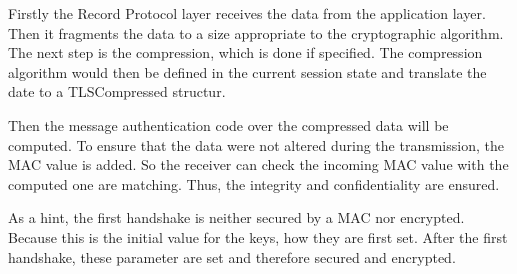 Firstly the Record Protocol layer receives the data from the application layer. Then it fragments the data to a size appropriate to the cryptographic algorithm. 
The next step is the compression, which is done if specified. The compression algorithm would then be defined in the current session state and translate the date to a TLSCompressed structur.
 
Then the message authentication code over the compressed data will be computed.
To ensure that the data were not altered during the transmission, the MAC value is added. So the receiver can check the incoming MAC value with the computed one are matching. Thus, the integrity and confidentiality are ensured.

As a hint, the first handshake is neither secured by a MAC nor encrypted. Because this is the initial value for the keys, how they are first set. After the first handshake, these parameter are set and therefore secured and encrypted.
\cite{ms:Record}
